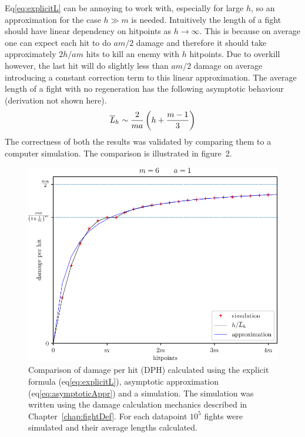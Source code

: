 Eq\ref{eq:explicitL} can be annoying to work with, especially for large $h$, so an approximation for the case $h \gg m$ is needed. Intuitively the length of a fight should have linear dependency on hitpoints as $h \rightarrow \infty$. This is because on average one can expect each hit to do $am/2$ damage and therefore it should take approximately $2h/am$ hits to kill an enemy with $h$ hitpoints. Due to overkill however, the last hit will do slightly less than $am/2$ damage on average introducing a constant correction term to this linear approximation.
The average length of a fight with no regeneration has the following asymptotic behaviour (derivation not shown here).
\begin{align}\label{eq:asymptoticAppr}
\overline{L}_h \sim \frac{2}{ma}\left(h + \frac{m-1}{3}\right)
\end{align}
The correctness of both the results was validated by comparing them to a computer simulation. The comparison is illustrated in figure~2.
\begin{figure}[t]\label{fig:apprComparison}
    \includegraphics[scale=1.1]{dph-appr-m6.pdf}
    \caption{Comparison of damage per hit (DPH) calculated using the explicit formula (eq\ref{eq:explicitL}), asymptotic approximation (eq\ref{eq:asymptoticAppr}) and a simulation. The simulation was written using the damage calculation mechanics described in Chapter~\ref{chap:fightDef}. For each datapoint $10^{5}$ fights were simulated and their average lengths calculated.}
\end{figure}

